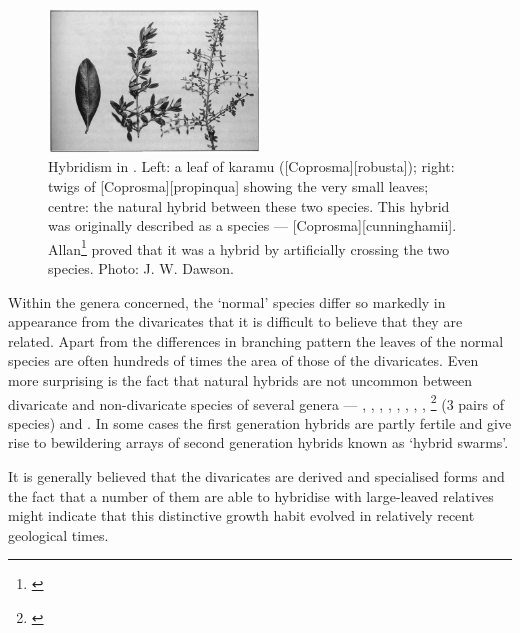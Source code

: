 \begin{figure}
	\includegraphics[width=0.5\textwidth]{graphics/figure80coprosma.jpg}
	\centering
	\caption[Hybridism in Coprosma]{Hybridism in .
	Left: a leaf of karamu ([Coprosma][robusta]); right: twigs of [Coprosma][propinqua] showing the very small leaves; centre: the natural hybrid between these two species.
	This hybrid was originally described as a species --- [Coprosma][cunninghamii].
	Allan\footnote{\cite{allan1924hybridity}} proved that it was a hybrid by artificially crossing the two species.
	Photo:  J. W. Dawson.}%
	\label{fig:80coprosma}
\end{figure}

Within the genera concerned, the `normal' species differ so markedly in appearance from the divaricates that it is difficult to believe that they are related.
Apart from the differences in branching pattern the leaves of the normal species are often hundreds of times the area of those of the divaricates.
Even more surprising is the fact that natural hybrids are not uncommon between divaricate and non-divaricate species of several genera --- , , , , , , , , \footnote{\cite{allan1924hybridity}} (3 pairs of species) and .
In some cases the first generation hybrids are partly fertile and give rise to bewildering arrays of second generation hybrids known as `hybrid swarms'.

It is generally believed that the divaricates are derived and specialised forms and the fact that a number of them are able to hybridise with large-leaved relatives might indicate that this distinctive growth habit evolved in relatively recent geological times.

